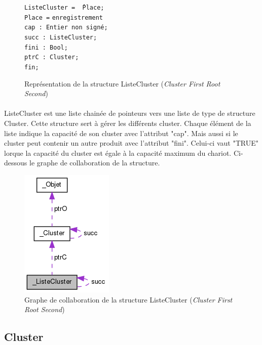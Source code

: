 \documentclass[twoside,UTF8]{EPURapport}
\begin{document}
\begin{figure}[H]

\begin{tabbing}
\texttt{ListeCluster = \^\,Place;} \\
\texttt{Place =} \= \texttt{enregistrement} \\
\> \texttt{cap : Entier non signé;} \\
\> \texttt{succ : ListeCluster;} \\
\> \texttt{fini : Bool;} \\
\> \texttt{ptrC : Cluster;} \\
\> \texttt{fin; } \\
\end{tabbing}

\caption{Représentation de la structure ListeCluster (\textit{Cluster First Root Second})}
\end{figure}

\paragraph{}ListeCluster est une liste chainée de pointeurs vers une liste de type de structure Cluster. Cette structure sert à gérer les différents cluster. Chaque élément de la liste indique la capacité de son cluster avec l'attribut "cap". Mais aussi si le cluster peut contenir un autre produit avec l'attribut "fini". Celui-ci vaut "TRUE" lorque la capacité du cluster est égale à la capacité maximum du chariot.
Ci-dessous le graphe de collaboration de la structure.

\begin{figure}[H]
\center
\includegraphics[scale=0.5]{images/struct_liste_cluster.png}
\caption{Graphe de collaboration de la structure ListeCluster (\textit{Cluster First Root Second})}
\end{figure} 


\subsection{Cluster}
\end{document}
